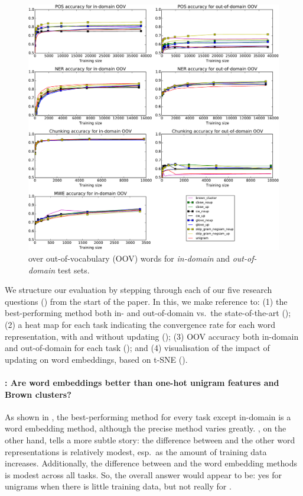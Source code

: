 \begin{figure}[t!]
\centering
    	\includegraphics[scale=0.5]{plots/OOV-plots}
\caption{\accuracy over out-of-vocabulary (OOV) words for \textit{in-domain} and \textit{out-of-domain} test sets.}
\label{OOV} 
\end{figure}

We structure our evaluation by stepping through each of our five
research questions (\RQ[1--5]) from the start of the paper. In this, we
make reference to: (1) the best-performing method both in- and
out-of-domain vs.\ the state-of-the-art (); (2) a
heat map for each task indicating the convergence rate for each word
representation, with and without updating (); 
(3) OOV accuracy both in-domain and out-of-domain for each task
(); and (4)  visualisation of the impact of
updating on word embeddings, based on t-SNE
().

\paragraph{\RQ[1]: Are word embeddings better than one-hot unigram features
  and Brown clusters?}  As shown in , the
best-performing method for every task except in-domain \chunking is a
word embedding method, although the precise method varies
greatly. , on the other hand, tells a more subtle
story: the difference between \unigram and the other word
representations is relatively modest, esp.\ as the amount of training
data increases. Additionally, the difference between \brown and the word
embedding methods is modest across all tasks. So, the overall answer
would appear to be: yes for unigrams when there is little training data, but not really for \brown.




